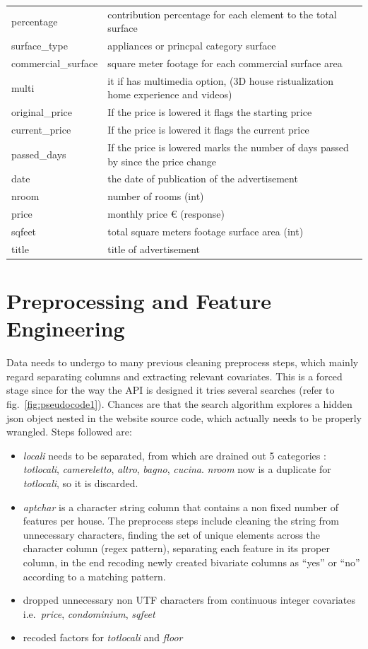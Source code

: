 \documentclass[
  12pt,
  a4paper,
  oneside]{book}
\providecommand{\tightlist}{%
  \setlength{\itemsep}{0pt}\setlength{\parskip}{0pt}}
\theoremstyle{definition}
\theoremstyle{definition}
\theoremstyle{definition}
\theoremstyle{remark}
\begin{document}
\begin{longtable}[t]{ll}
percentage & contribution percentage for each element to the total surface\\
surface\_type & appliances or princpal category surface\\
commercial\_surface & square meter footage for each commercial surface area\\
\addlinespace
multi & it if has multimedia option, (3D house ristualization home experience and videos)\\
original\_price & If the price is lowered it flags the starting price\\
current\_price & If the price is lowered it flags the current price\\
passed\_days & If the price is lowered marks the number of days passed by since the price change\\
date & the date of publication of the advertisement\\
\addlinespace
nroom & number of rooms (int)\\
price & monthly price € (response)\\
sqfeet & total square meters footage surface area (int)\\
title & title of advertisement\\
\bottomrule
\end{longtable}

\hypertarget{prep}{%
\section{Preprocessing and Feature Engineering}\label{prep}}

Data needs to undergo to many previous cleaning preprocess steps, which mainly regard separating columns and extracting relevant covariates. This is a forced stage since for the way the API is designed it tries several searches (refer to fig.~\ref{fig:pseudocode1}). Chances are that the search algorithm explores a hidden json object nested in the website source code, which actually needs to be properly wrangled. Steps followed are:

\begin{itemize}
\tightlist
\item
  \emph{locali} needs to be separated, from which are drained out 5 categories : \emph{totlocali}, \emph{camereletto}, \emph{altro}, \emph{bagno}, \emph{cucina}. \emph{nroom} now is a duplicate for \emph{totlocali}, so it is discarded.
\item
  \emph{aptchar} is a character string column that contains a non fixed number of features per house. The preprocess steps include cleaning the string from unnecessary characters, finding the set of unique elements across the character column (regex pattern), separating each feature in its proper column, in the end recoding newly created bivariate columns as ``yes'' or ``no'' according to a matching pattern.
\item
  dropped unnecessary non UTF characters from continuous integer covariates i.e.~\emph{price}, \emph{condominium}, \emph{sqfeet}
\item
  recoded factors for \emph{totlocali} and \emph{floor}
\end{itemize}
\end{document}
